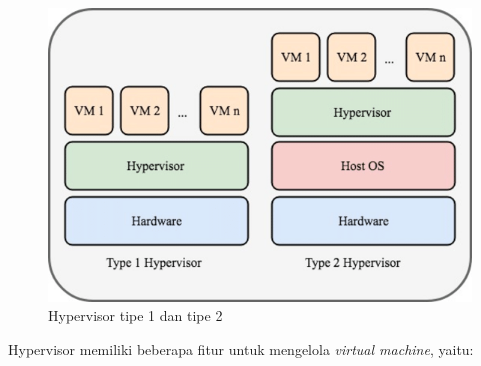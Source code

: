 \begin{figure}[H]
  \centering

  \includegraphics[scale=0.55]{gambar/Type-1-and-type-2-hypervisors.png}

  \caption{Hypervisor tipe 1 dan tipe 2 \parencite{nfv}}
  \label{fig:arsitektur-hypervisor-1-2}
\end{figure}

Hypervisor memiliki beberapa fitur untuk mengelola \emph{virtual machine}, yaitu:


